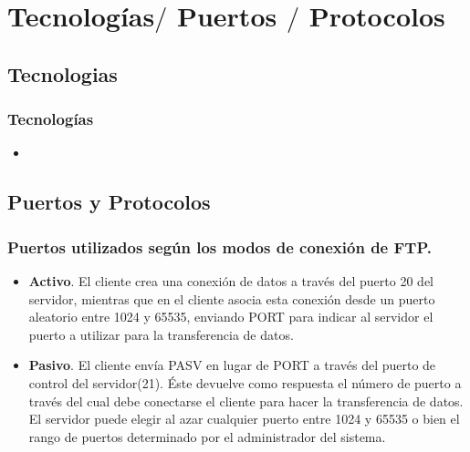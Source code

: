 \section{Tecnolog\'ias$/$ Puertos $/$ Protocolos}
\subsection{Tecnologias}
  \begin{frame}
    \frametitle{Tecnolog\'ias}
    \begin{itemize}
    	\item 
    \end{itemize}
  \end{frame}

\subsection{Puertos y Protocolos}
\begin{frame}
\normalsize
  	\frametitle{Puertos utilizados según los modos de conexión de FTP.}
  	\begin{itemize}
  	\item {\bf Activo}. El cliente crea una conexión de datos a través del puerto 20 del servidor, mientras que en el cliente asocia esta conexión desde un puerto aleatorio entre 1024 y 65535, enviando PORT para indicar al servidor el puerto a utilizar para la transferencia de datos.

  	\item {\bf Pasivo}. El cliente envía PASV en lugar de PORT a través del puerto de control del servidor(21). Éste devuelve como respuesta el número de puerto a través del cual debe conectarse el cliente para hacer la transferencia de datos. El servidor puede elegir al azar cualquier puerto entre 1024 y 65535 o bien el rango de puertos determinado por el administrador del sistema.
  	\end{itemize}
\end{frame}
